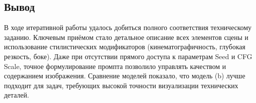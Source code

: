 \subsection{Вывод}
В ходе итеративной работы удалось добиться полного соответствия техническому заданию.
Ключевым приёмом стало детальное описание всех элементов сцены и использование стилистических модификаторов
(кинематографичность, глубокая резкость, боке). Даже при отсутствии прямого доступа к параметрам Seed и CFG Scale,
точное формулирование промпта позволило управлять качеством и содержанием изображения. Сравнение моделей показало,
что модель (b) лучше подходит для задач, требующих высокой точности визуализации технических деталей.